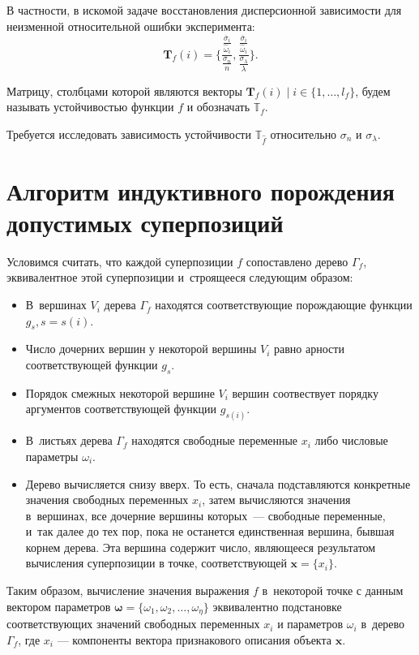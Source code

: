 \documentclass[12pt,a4paper]{article}
\begin{document}
В частности, в искомой задаче восстановления дисперсионной зависимости для неизменной
относительной ошибки эксперимента:
\[
  \mathbf{T}_f(i) = \Big\{ \frac{\frac{\overline{\sigma}_i}{\hat{\omega}_i}}{\frac{\sigma_n}{n}}, \frac{\frac{\overline{\sigma}_i}{\hat{\omega}_i}}{\frac{\sigma_{\lambda}}{\lambda}} \Big\}.
\]

Матрицу, столбцами которой являются векторы $\mathbf{T}_f(i) \mid i \in \{ 1, \dots, l_f \}$,
будем называть устойчивостью функции $f$ и обозначать $\mathbb{T}_f$.

Требуется исследовать зависимость устойчивости $\mathbb{T}_{\hat{f}}$ относительно
$\sigma_n$ и $\sigma_{\lambda}$.

\section{Алгоритм индуктивного порождения допустимых суперпозиций}

Условимся считать, что каждой суперпозиции $f$ сопоставлено дерево $\Gamma_f$,
эквивалентное этой суперпозиции и~строящееся следующим образом:

\begin{itemize}
  \item В~вершинах $V_i$ дерева $\Gamma_f$ находятся соответствующие
	порождающие функции $g_s, s = s(i)$.
  \item Число дочерних вершин у некоторой вершины $V_i$ равно арности
	соответствующей функции $g_s$.
  \item Порядок смежных некоторой вершине $V_i$ вершин соотвествует порядку
	аргументов соответствующей функции $g_{s(i)}$.
  \item В~листьях дерева $\Gamma_f$ находятся свободные переменные $x_i$
	либо числовые параметры $\omega_i$.
  \item Дерево вычисляется снизу вверх. То есть, сначала подставляются
	конкретные значения свободных переменных $x_i$,
	затем вычисляются значения в~вершинах, все дочерние вершины которых~---
	свободные переменные, и~так далее до тех пор, пока не останется
	единственная вершина, бывшая корнем дерева. Эта вершина содержит
	число, являющееся результатом вычисления суперпозиции в точке,
	соответствующей $\mathbf{x} = \{ x_i \}$.
\end{itemize}

Таким образом, вычисление значения выражения $f$ в~некоторой точке с данным
вектором параметров $\boldsymbol{\omega} = \{ \omega_1, \omega_2, \dots, \omega_\eta\}$
эквивалентно подстановке соответствующих значений свободных переменных $x_i$
и параметров $\omega_i$ в~дерево $\Gamma_f$, где $x_i$ --- компоненты
вектора признакового описания объекта $\mathbf{x}$.
\end{document}
